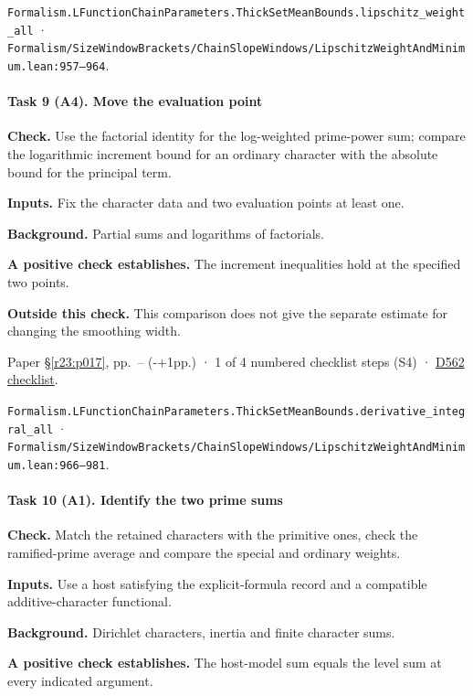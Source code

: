 \nolinkurl{Formalism.LFunctionChainParameters.ThickSetMeanBounds.lipschitz_weight_all} · \nolinkurl{Formalism/SizeWindowBrackets/ChainSlopeWindows/LipschitzWeightAndMinimum.lean:957–964}.

\paragraph{Task 9 (A4). Move the evaluation point}\label{v7:task-9}

\textbf{Check.} Use the factorial identity for the log-weighted prime-power sum; compare the logarithmic increment bound for an ordinary character with the absolute bound for the principal term.

\textbf{Inputs.} Fix the character data and two evaluation points at least one.

\textbf{Background.} Partial sums and logarithms of factorials.

\textbf{A positive check establishes.} The increment inequalities hold at the specified two points.

\textbf{Outside this check.} This comparison does not give the separate estimate for changing the smoothing width.

Paper \S\ref{r23:p017}, pp.\ \pageref{r24:regular}--\pageref{v5:regular-end} (\number\numexpr{}-+1\relax pp.) · 1 of 4 numbered checklist steps (S4) · \href{https://github.com/GunheeC/rh-lean-verification-atlas/blob/v0.1.0/units/D562.check.md}{D562 checklist}.

\nolinkurl{Formalism.LFunctionChainParameters.ThickSetMeanBounds.derivative_integral_all} · \nolinkurl{Formalism/SizeWindowBrackets/ChainSlopeWindows/LipschitzWeightAndMinimum.lean:966–981}.

\paragraph{Task 10 (A1). Identify the two prime sums}\label{v7:task-10}

\textbf{Check.} Match the retained characters with the primitive ones, check the ramified-prime average and compare the special and ordinary weights.

\textbf{Inputs.} Use a host satisfying the explicit-formula record and a compatible additive-character functional.

\textbf{Background.} Dirichlet characters, inertia and finite character sums.

\textbf{A positive check establishes.} The host-model sum equals the level sum at every indicated argument.

